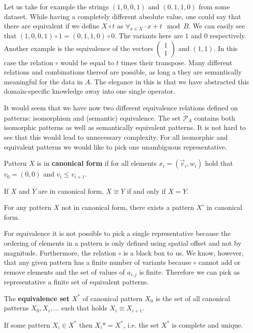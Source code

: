\documentclass{llncs}
\begin{document}
Let us take for example the strings $(1,0,0,1)$ and $(0,1,1,0)$ from some dataset. While having a completely different absolute value, one could say that there are equivalent if we define $X\circ t$ as $\forall_{x\in X} \cdot {x+t\!\mod B}$. We can easily see that $(1,0,0,1)\circ 1 =(0,1,1,0)\circ 0$. The variants here are $1$ and $0$ respectively. Another example is the equivalence of the vectors $\begin{pmatrix}
1 \\ 1\end{pmatrix}$ and $(1,1)$. In this case the relation $\circ$ would be equal to $t$ times their transpose. Many different relations and combinations thereof are possible, as long a they are semantically meaningful for the data in $A$. The elegance in this is that we have abstracted this domain-specific knowledge away into one single operator.

It would seem that we have now two different equivalence relations defined on patterns: isomorphism and (semantic) equivalence. The set $\tilde{\mathcal{P}}_A$ contains both isomorphic patterns as well as semantically equivalent patterns. It is not hard to see that this would lead to unnecessary complexity. For all isomorphic and equivalent patterns we would like to pick one unambiguous representative.
\begin{definition}
Pattern $X$ is in \textbf{canonical form} if for all elements $x_i=(\vec{v}_i, w_i)$ hold that $v_0=(0,0)$ and $v_i\leq v_{i+1}$.
\end{definition}
\begin{theorem}
If $X$ and $Y$ are in canonical form, $X\cong Y$ if and only if $X=Y$.
\end{theorem}
\begin{theorem}\label{thmexistcano}
For any pattern $X$ not in canonical form, there exists a pattern $X'$ in canonical form.
\end{theorem}

For equivalence it is not possible to pick a single representative because the ordering of elements in a pattern is only defined using spatial offset and not by magnitude. Furthermore, the relation $\circ$ is a black box to us. We know, however, that any given pattern has a finite number of variants because $\circ$ cannot add or remove elements and the set of values of $a_{i,j}$ is finite. Therefore we can pick as representative a finite set of equivalent patterns.
\begin{definition}
The \textbf{equivalence set} $X^*$ of canonical pattern $X_0$ is the set of all canonical patterns $X_0,X_i,\dots$ such that holds $X_i \equiv X_{i+1}$.
\end{definition}
\begin{theorem}
If some pattern $X_i \in X^*$ then $X_i*=X^*$, i.e. the set $X^*$ is complete and unique.
\end{theorem}
\end{document}
